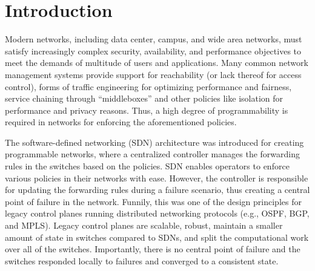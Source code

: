 \section{Introduction}
Modern networks, including data center, campus, 
and wide area networks, 
must satisfy increasingly complex security, 
availability, and performance objectives to 
meet the demands of multitude of users and applications. 
Many common network management systems provide support
for reachability (or lack thereof for access control),
forms of traffic engineering for optimizing performance
and fairness, service chaining through ``middleboxes'' and
other policies like isolation for performance and privacy reasons.
Thus, a high degree of programmability is required in networks
for enforcing the aforementioned policies.

The software-defined networking (SDN) architecture was introduced
for creating programmable networks, where a centralized controller
manages the forwarding rules in the switches based on the policies.
SDN enables operators to enforce various policies in their networks 
with ease. 
However, the controller is responsible for updating the forwarding
rules during a failure scenario, thus creating a central point of 
failure in the network. Funnily, this was one of the design principles
for legacy control planes running distributed networking protocols 
(e.g., OSPF, BGP, and MPLS). 
Legacy control planes are scalable, robust, maintain a smaller amount 
of state in switches compared to SDNs, 
and split the computational work over all of the switches. 
Importantly, there is no central point of failure and the switches
responded locally to failures and converged to a consistent state. 

